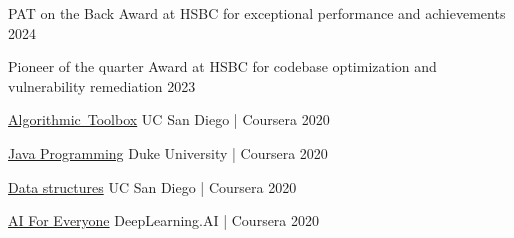 

\begin{cvhonors}

  \cvhonor
    {PAT on the Back Award} %
    { at HSBC for exceptional performance and achievements} %
    {} %
    {2024} %

  \cvhonor
    {Pioneer of the quarter Award} %
    {at HSBC for codebase optimization and vulnerability remediation} %
    {} %
    {2023} %

  \cvhonor
    {\mbox{\href{https://coursera.org/verify/VP7C5D2JE2KF}{Algorithmic Toolbox}}} %
    {UC San Diego | Coursera} %
    {} %
    {2020} %

  \cvhonor
    {\href{https://coursera.org/verify/MYLZLP7VWE57}{Java Programming}} %
    {Duke University | Coursera} %
    {} %
    {2020} %

  \cvhonor
    {\href{https://coursera.org/verify/VP7C5D2JE2KF}{Data structures}} %
    {UC San Diego | Coursera} %
    {} %
    {2020} %

  \cvhonor
    {\href{https://coursera.org/verify/XUXKCM653DX8}{AI For Everyone}} %
    {DeepLearning.AI | Coursera} %
    {} %
    {2020} %


\end{cvhonors}
